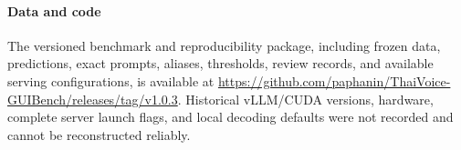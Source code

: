 \paragraph{Data and code}
The versioned benchmark and reproducibility package, including frozen data, predictions, exact prompts, aliases, thresholds, review records, and available serving configurations, is available at \url{https://github.com/paphanin/ThaiVoice-GUIBench/releases/tag/v1.0.3}. Historical vLLM/CUDA versions, hardware, complete server launch flags, and local decoding defaults were not recorded and cannot be reconstructed reliably.

